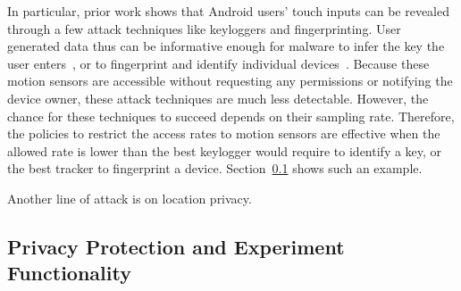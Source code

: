 In particular, prior work shows 
that Android users' touch inputs can be revealed through a few attack 
techniques like keyloggers and fingerprinting. 
User generated data thus can be informative enough 
for malware to infer the key the user enters~\cite{cai2011touchlogger, 
owusu2012accessory}, or to fingerprint and identify individual 
devices~\cite{bojinov2014mobile, dey2014accelprint}. Because these 
motion sensors are accessible 
without requesting any 
permissions or notifying the device owner, these attack techniques are much 
less detectable. However, the chance for these techniques to succeed
depends on their sampling rate. 
Therefore, the policies to restrict the access rates to motion sensors 
are effective when the allowed rate is lower than the best keylogger 
would require to identify a key, or the best tracker to fingerprint a device.
Section~\ref{sec-experiment} shows such an example. 

Another line of attack is on location privacy. 


\subsection{Privacy Protection and Experiment Functionality}\label{sec-experiment}



